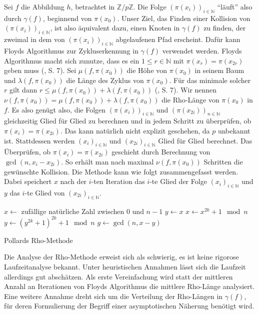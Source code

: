 \documentclass[a4paper, 11pt, ngerman]{article}
\newcommand{\N}{\mathbb{N}}
\newcommand{\Z}{\mathbb{Z}}
\theoremstyle{definition}
\theoremstyle{plain}
\theoremstyle{remark}
\begin{document}
Sei $f$ die Abbildung $h$, betrachtet in $\Z/p\Z$. Die Folge $(\pi(x_{i}))_{i \in \N}$ "`läuft"' also durch $\gamma(f)$, beginnend von $\pi(x_0)$. Unser Ziel, das Finden einer Kollision von $(\pi(x_i))_{i \in \N}$, ist also äquivalent dazu, einen Knoten in $\gamma(f)$ zu finden, der zweimal in dem von $(\pi(x_i))_{i \in \N}$ abgelaufenen Pfad erscheint. Dafür kann Floyds Algorithmus zur Zykluserkennung in $\gamma(f)$ verwendet werden. Floyds Algorithmus macht sich zunutze, dass es ein $1 \le r \in \N$ mit $\pi(x_r) = \pi(x_{2r})$ geben muss (\cite{knu98}, S. 7). Sei $\mu(f, \pi(x_0))$ die Höhe von $\pi(x_0)$ in seinem Baum und $\lambda(f, \pi(x_0))$ die Länge des Zyklus von $\pi(x_0)$. Für das minimale solcher $r$ gilt dann $r \le \mu(f, \pi(x_0)) + \lambda(f, \pi(x_0))$ (\cite{knu98}, S. 7). Wir nennen $\nu(f, \pi(x_0)) = \mu(f, \pi(x_0)) + \lambda(f, \pi(x_0))$ die Rho-Länge von $\pi(x_0)$ in $f$. Es also genügt also, die Folgen $(\pi(x_i))_{i \in \N}$ und $(\pi(x_{2i}))_{n \in \N}$ gleichzeitig Glied für Glied zu berechnen und in jedem Schritt zu überprüfen, ob $\pi(x_i) = \pi(x_{2i})$. Das kann natürlich nicht explizit geschehen, da $p$ unbekannt ist. Stattdessen werden $(x_i)_{i \in \N}$ und $(x_{2i})_{i \in \N}$ Glied für Glied berechnet. Das Überprüfen, ob $\pi(x_i) = \pi(x_{2i})$ geschieht durch Berechnung von $\gcd(n, x_i - x_{2i})$. So erhält man nach maximal $\nu(f, \pi(x_0))$ Schritten die gewünschte Kollision. Die Methode kann wie folgt zusammengefasst werden. Dabei speichert $x$ nach der $i$-ten Iteration das $i$-te Glied der Folge $(x_i)_{i \in \N}$ und $y$ das $i$-te Glied von $(x_{2i})_{i \in \N}$.

\begin{algorithm*}
    $x \gets $ zufällige natürliche Zahl zwischen $0$ und $n - 1$ \;
    $y \gets x$ \;
    {
        $x \gets x^{2k} + 1 \mod n$ \;
        $y \gets (y^{2k} + 1)^{2k} + 1 \mod n$ \;
        $g \gets \gcd(n, x - y)$ \;
        {
             \;
        }
    }

    \caption{Pollards Rho-Methode}
\end{algorithm*}

Die Analyse der Rho-Methode erweist sich als schwierig, es ist keine rigorose Laufzeitanalyse bekannt. Unter heuristischen Annahmen lässt sich die Laufzeit allerdings gut abschätzen. Als erste Vereinfachung wird statt der mittleren Anzahl an Iterationen von Floyds Algorithmus die mittlere Rho-Länge analysiert. Eine weitere Annahme dreht sich um die Verteilung der Rho-Längen in $\gamma(f)$, für deren Formulierung der Begriff einer asymptotischen Näherung benötigt wird.
\end{document}
